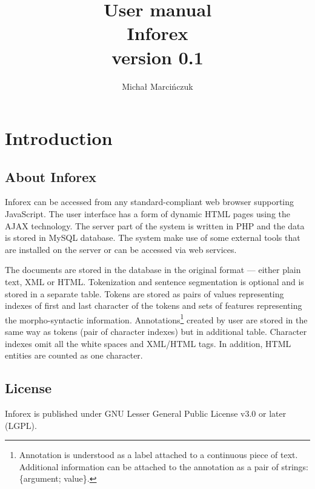 \documentclass[a4paper,10pt,oneside]{scrbook}
\title{User manual \\ Inforex \\ {\large version 0.1}}
\author{Michał Marcińczuk}
\begin{document}
\maketitle

\chapter{Introduction}
\section{About Inforex}


Inforex can be accessed from any standard-compliant web browser supporting JavaScript. The user interface has a form of dynamic HTML pages using the AJAX technology. The server part of the system is written in PHP and the data is stored in MySQL database. The system make use of some external tools that are installed on the server or can be accessed via web services.

The documents are stored in the database in the original format --- either plain text, XML or HTML. Tokenization and sentence segmentation is optional and is stored in a separate table. Tokens are stored as pairs of values representing indexes of first and last character of the tokens and sets of features representing the morpho-syntactic information. Annotations\footnote{Annotation is understood as a label attached to a continuous piece of text. Additional information can be attached to the annotation as a pair of strings: \{argument; value\}.} created by user are stored in the same way as tokens (pair of character indexes) but in additional table. Character indexes omit all the white spaces and XML/HTML tags. In addition, HTML entities are counted as one character. 

\section{License}

Inforex is published under GNU Lesser General Public License v3.0 or later (LGPL).


\end{document}
